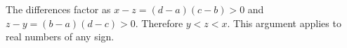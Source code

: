 The differences factor as $x-z=(d-a)(c-b)>0$ and $z-y=(b-a)(d-c)>0$. Therefore $\boxed{y<z<x}$. This argument applies to real numbers of any sign.

